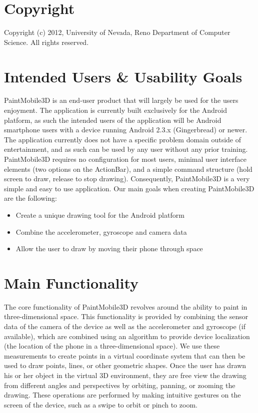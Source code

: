 \documentclass{chi-ext}
\begin{document}
\pagebreak

\section{Copyright}
Copyright (c) 2012, University of Nevada, Reno Department of Computer Science.
All rights reserved.

\section{Intended Users \& Usability Goals}

PaintMobile3D is an end-user product that will largely be used for the users enjoyment. The application is currently built exclusively for the Android platform, as such the intended users of the application will be Android smartphone users with a device running Android 2.3.x (Gingerbread) or newer. The application currently does not have a specific problem domain outside of entertainment, and as such can be used by any user without any prior training. PaintMobile3D requires no configuration for most users, minimal user interface elements (two options on the ActionBar), and a simple command structure (hold screen to draw, release to stop drawing). Consequently, PaintMobile3D is a very simple and easy to use application. Our main goals when creating PaintMobile3D are the following:

\begin{itemize}
\item
Create a unique drawing tool for the Android platform
\item
Combine the accelerometer, gyroscope and camera data
\item
Allow the user to draw by moving their phone through space
\end{itemize}

\section{Main Functionality}

The core functionality of PaintMobile3D revolves around the ability to paint in three-dimensional space. This functionality is provided by combining the sensor data of the camera of the device as well as the accelerometer and gyroscope (if available), which are combined using an algorithm to provide device localization (the location of the phone in a three-dimensional space). We use these measurements to create points in a virtual coordinate system that can then be used to draw points, lines, or other geometric shapes. Once the user has drawn his or her object in the virtual 3D environment, they are free view the drawing from different angles and perspectives by orbiting, panning, or zooming the drawing. These operations are performed by making intuitive gestures on the screen of the device, such as a swipe to orbit or pinch to zoom.
\end{document}

